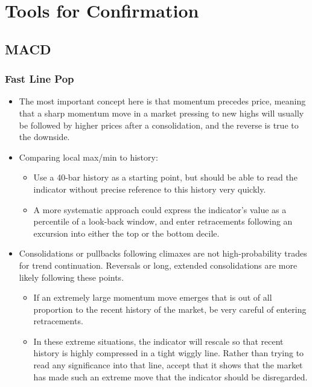 \documentclass{../notes}
\begin{document}
\section{Tools for Confirmation}
\subsection{MACD}
\subsubsection{Fast Line Pop}
\begin{itemize}
  \item The most important concept here is that momentum precedes price, meaning that a sharp momentum move in a market pressing to new highs will usually be followed by higher prices after a consolidation, and the reverse is true to the downside.
  \item Comparing local max/min to history:
  \begin{itemize}
    \item Use a 40-bar history as a starting point, but should be able to read the indicator without precise reference to this history very quickly.
    \item A more systematic approach could express the indicator’s value as a percentile of a look-back window, and enter retracements following an excursion into either the top or the bottom decile.
  \end{itemize}
  \item Consolidations or pullbacks following climaxes are not high-probability trades for trend continuation. Reversals or long, extended consolidations are more likely following these points.
  \begin{itemize}
    \item If an extremely large momentum move emerges that is out of all proportion to the recent history of the market, be very careful of entering retracements.
    \item In these extreme situations, the indicator will rescale so that recent history is highly compressed in a tight wiggly line. Rather than trying to read any significance into that line, accept that it shows that the market has made such an extreme move that the indicator should be disregarded.
  \end{itemize}
\end{itemize}
\end{document}
